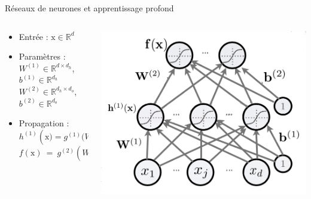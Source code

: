 \documentclass[french]{beamer}
\begin{document}
\begin{frame}{Réseaux de neurones et apprentissage profond}
\begin{columns}[T]
\begin{column}{.48\textwidth}
\begin{itemize}
	\item Entrée : $\mathrm{x} \in \mathbb{R}^d$
	\item Paramètres : \\ $W^{(1)} \in \mathbb{R}^{d\times d_h}$, $b^{(1)} \in \mathbb{R}^{d_h}$ \\ $W^{(2)} \in \mathbb{R}^{d_h \times d_o}$, $b^{(2)} \in \mathbb{R}^{d_o}$
	\item Propagation : \\ {\small $h^{(1)}\left(\mathrm{x}) = g^{(1)}(W^{(1), T}\mathrm{x} + b^{(1)}\right)$} \\ {\small$f(\mathrm{x})~=~g^{(2)}\left(W^{(2), T} h^{(1)}(\mathrm{x})~+~b^{(2)}\right)$}
\end{itemize}
\end{column}
\hfill
\begin{column}{.48\textwidth}
\includegraphics[width=\textwidth]{figures/nn}
\end{column}
\end{columns}
\end{frame}
\end{document}
